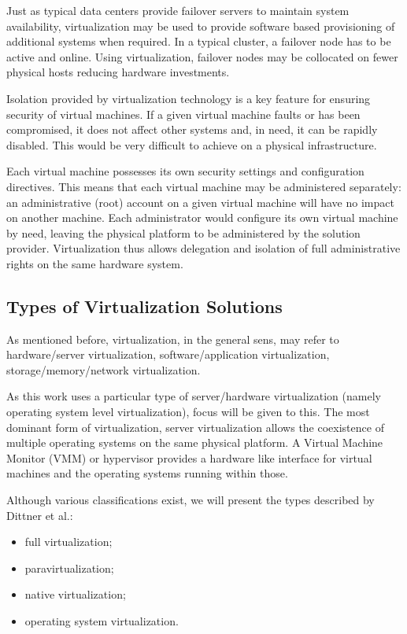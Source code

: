 Just as typical data centers provide failover servers to maintain system
availability, virtualization may be used to provide software based
provisioning of additional systems when required. In a typical cluster, a
failover node has to be active and online. Using virtualization, failover
nodes may be collocated on fewer physical hosts reducing hardware investments.

Isolation provided by virtualization technology is a key feature for ensuring
security of virtual machines. If a given virtual machine faults or has been
compromised, it does not affect other systems and, in need, it can be rapidly
disabled. This would be very difficult to achieve on a physical
infrastructure.

Each virtual machine possesses its own security settings and configuration
directives. This means that each virtual machine may be administered
separately: an administrative (root) account on a given virtual machine will
have no impact on another machine. Each administrator would configure its own
virtual machine by need, leaving the physical platform to be administered by
the solution provider. Virtualization thus allows delegation and isolation of
full administrative rights on the same hardware system.

\subsection{Types of Virtualization Solutions}

As mentioned before, virtualization, in the general sens, may refer to
hardware/server virtualization, software/application virtualization,
storage/memory/network virtualization.

As this work uses a particular type of server/hardware virtualization (namely
operating system level virtualization), focus will be given to this. The most
dominant form of virtualization, server virtualization allows the coexistence
of multiple operating systems on the same physical platform. A Virtual Machine
Monitor (VMM) or hypervisor provides a hardware like interface for virtual
machines and the operating systems running within those.

Although various classifications exist, we will present the types described by
Dittner et al.:

\begin{itemize}
  \item full virtualization;
  \item paravirtualization;
  \item native virtualization;
  \item operating system virtualization.
\end{itemize}

